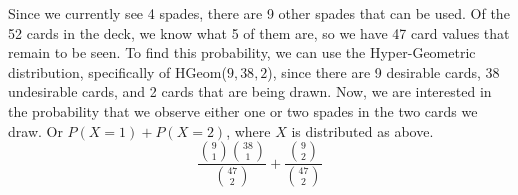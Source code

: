 \documentclass[11pt]{article}
\newif\ifdraft
\begin{document}
\begin{solution}{2}
Since we currently see 4 spades, there are 9 other spades that can be used. Of the 52 cards in the deck, we know what 5 of them are, so we have 47 card values that remain to be seen. To find this probability, we can use the Hyper-Geometric distribution, specifically of HGeom($9, 38, 2$), since there are 9 desirable cards, 38 undesirable cards, and 2 cards that are being drawn. Now, we are interested in the probability that we observe either one or two spades in the two cards we draw. Or $P(X = 1) + P(X=2)$, where $X$ is distributed as above. 
    $$\frac{{9 \choose 1}{38 \choose 1}}{{47 \choose 2}} + \frac{{9 \choose 2}}{{47 \choose 2}}$$
\end{solution}
\ifdraft
\begin{exercise}{Conditional Binomial}
Suppose $X \sim \Bin(n_1, p)$ and $Y \sim \Bin(n_2, p)$ are independent. What is the conditional distribution of $X$ given that $X + Y = k$, where $k \in \{0, 1, \ldots, n_1 + n_2\}$?
\end{exercise}

\begin{solution}{3}
We can use Bayes' Theorem to find the PMF of $X | X + Y = k$.
\begin{align*}
P(X = j | X + Y = k) &= \frac{P(X + Y = k | X = j)P(X = j)}{P(X + Y = k)} \\
&= \frac{P(Y = k - j)P(X = j)}{P(X + Y = k)} \\
&= \frac{\binom{n_2}{k - j}p^{k - j}(1 - p)^{n_2 - (k - j)}\binom{n_1}{j}p^j(1 - p)^{n_1 - j}}{\binom{n_1 + n_2}{k}p^k(1 - p)^{n_1 + n_2 - k}} \\
&= \frac{\binom{n_2}{k - j}\binom{n_1}{j}p^k(1 - p)^{n_1 + n_2 - k}}{\binom{n_1 + n_2}{k}p^k(1 - p)^{n_1 + n_2 - k}} \\
&= \frac{\binom{n_2}{k - j}\binom{n_1}{j}}{\binom{n_1 + n_2}{k}}
\end{align*}
This is the PMF of the Hypergeometric distribution with parameters $n_1$, $n_2$, $k$, which we'll learn more about in next week's lectures.
\end{solution}
\fi
\end{document}
